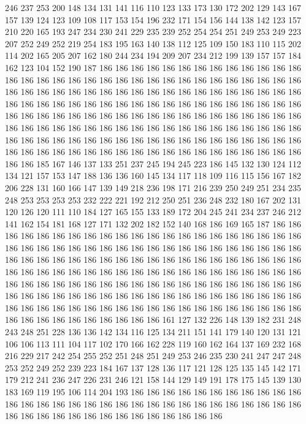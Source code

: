 246 237 253 200 148 134 131 141 116 110 123 133 173 130 172 202 129 143 167 157
139 124 123 109 108 117 153 154 196 232 171 154 156 144 138 142 123 157 210 220
165 193 247 234 230 241 229 235 239 252 254 254 251 249 253 249 223 207 252 249
252 219 254 183 195 163 140 138 112 125 109 150 183 110 115 202 114 202 165 205
207 162 180 244 234 194 209 207 234 212 199 139 157 157 184 162 123 104 152 190
187 186 186 186 186 186 186 186 186 186 186 186 186 186 186 186 186 186 186 186
186 186 186 186 186 186 186 186 186 186 186 186 186 186 186 186 186 186 186 186
186 186 186 186 186 186 186 186 186 186 186 186 186 186 186 186 186 186 186 186
186 186 186 186 186 186 186 186 186 186 186 186 186 186 186 186 186 186 186 186
186 186 186 186 186 186 186 186 186 186 186 186 186 186 186 186 186 186 186 186
186 186 186 186 186 186 186 186 186 186 186 186 186 186 186 186 186 186 186 186
186 186 186 186 186 186 186 186 186 186 186 186 186 186 186 186 186 186 186 186
186 186 186 186 186 186 186 186 186 185 167 146 137 133 251 237 245 194 245 223
186 145 132 130 124 112 134 121 157 153 147 188 136 136 160 145 134 117 118 109
116 115 156 167 182 206 228 131 160 166 147 139 149 218 236 198 171 216 239 250
249 251 234 235 248 253 253 253 253 232 222 221 192 212 250 251 236 248 232 180
167 202 131 120 126 120 111 110 184 127 165 155 133 189 172 204 245 241 234 237
246 212 141 162 154 181 168 127 171 132 202 182 152 140 168 186 169 165 187 186
186 186 186 186 186 186 186 186 186 186 186 186 186 186 186 186 186 186 186 186
186 186 186 186 186 186 186 186 186 186 186 186 186 186 186 186 186 186 186 186
186 186 186 186 186 186 186 186 186 186 186 186 186 186 186 186 186 186 186 186
186 186 186 186 186 186 186 186 186 186 186 186 186 186 186 186 186 186 186 186
186 186 186 186 186 186 186 186 186 186 186 186 186 186 186 186 186 186 186 186
186 186 186 186 186 186 186 186 186 186 186 186 186 186 186 186 186 186 186 186
186 186 186 186 186 186 186 186 186 186 186 186 186 186 186 186 186 186 186 186
186 186 186 186 161 127 132 226 148 139 182 231 248 243 248 251 228 136 136 142
134 116 125 134 211 151 141 179 140 120 131 121 106 106 113 111 104 117 102 170
166 162 228 119 160 162 164 137 169 232 168 216 229 217 242 254 255 252 251 248
251 249 253 246 235 230 241 247 247 248 253 252 249 252 239 223 184 167 137 128
136 117 121 128 125 135 145 142 171 179 212 241 236 247 226 231 246 121 158 144
129 149 191 178 175 145 139 130 183 169 119 195 106 114 204 193 186 186 186 186
186 186 186 186 186 186 186 186 186 186 186 186 186 186 186 186 186 186 186 186
186 186 186 186 186 186 186 186 186 186 186 186 186 186 186 186 186 186 186 186
